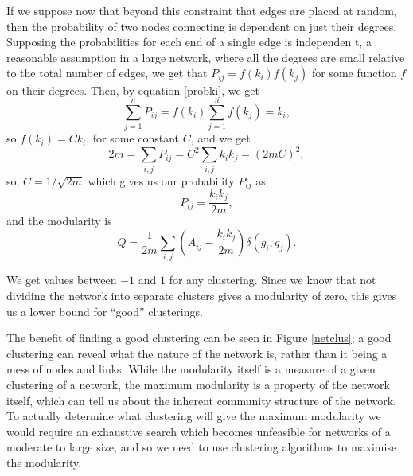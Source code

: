 If we suppose now that beyond this constraint that edges are placed at random, 
then the probability of two nodes connecting is dependent on just their 
degrees. Supposing the probabilities for each end of a single edge is independen
t, a reasonable assumption in a large network, where all the degrees are small 
relative to the total number of edges, we get that $P_{ij} = f(k_i)f(k_j)$ for 
some function $f$ on their degrees.  Then, by equation \ref{probki}, we get
\begin{equation}
\sum_{j=1}^{n}P_{ij} = f(k_i)\sum_{j=1}^nf(k_j)=k_i,
\end{equation}
so $f(k_i) = Ck_i$, for some constant $C$, and we get
\begin{equation}
2m = \sum_{i,j}P_{ij} = C^2\sum_{i,j}k_ik_j = (2mC)^2,
\end{equation}
so, $C = 1/\sqrt{2m}$ which gives us our probability $P_{ij}$ as
\begin{equation}
P_{ij} = \frac{k_ik_j}{2m},
\end{equation}
and the modularity is
\begin{equation}
Q= \frac{1}{2m}\sum_{i,j} \left(A_{ij} -
\frac{k_ik_j}{2m}\right)\delta(g_i,g_j).
\end{equation}

 We get values between $-1$ and $1$ for any clustering.  Since we know that not 
dividing the network into separate clusters gives a modularity of zero, this 
gives us a lower bound for ``good'' clusterings.

The benefit of finding a good clustering can be seen in Figure \ref{netclus}; 
a good clustering can reveal what the nature of the network is, rather than it 
being a mess of nodes and links.  While the modularity itself is a measure of a 
given clustering of a network, the maximum modularity is a property of the 
network itself, which can tell us about the inherent community structure of the 
network. To actually determine what clustering will give the maximum modularity 
we would require an exhaustive search which becomes unfeasible for networks of 
a moderate to large size, and so we need to use clustering algorithms to 
maximise the modularity.



